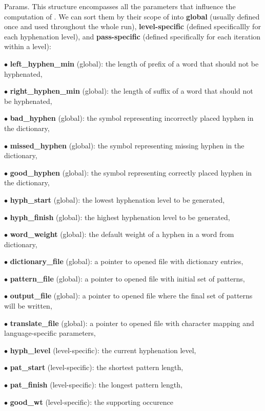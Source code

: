 Params.
This structure encompasses all the parameters that influence the computation of
\utfpatgen. We can sort them by their
scope of into {\bf global} (usually defined once and used throughout the whole
run), {\bf level-specific} (defined
specificallly for each hyphenation level), and {\bf pass-specific} (defined
specifically for each iteration within
a level):

\item{$\bullet$} {\bf left\_hyphen\_min} (global): the length of prefix of a
word that should not be hyphenated,
\item{$\bullet$} {\bf right\_hyphen\_min} (global): the length of suffix of a
word that should not be hyphenated,
\item{$\bullet$} {\bf bad\_hyphen} (global): the symbol representing
incorrectly placed hyphen in the dictionary,
\item{$\bullet$} {\bf missed\_hyphen} (global): the symbol representing missing
hyphen in the dictionary,
\item{$\bullet$} {\bf good\_hyphen} (global): the symbol representing correctly
placed hyphen in the dictionary,
\item{$\bullet$} {\bf hyph\_start} (global): the lowest hyphenation level to be
generated,
\item{$\bullet$} {\bf hyph\_finish} (global): the highest hyphenation level to
be generated,
\item{$\bullet$} {\bf word\_weight} (global): the default weight of a hyphen in
a word from dictionary,
\item{$\bullet$} {\bf dictionary\_file} (global): a pointer to opened file with
dictionary entries,
\item{$\bullet$} {\bf pattern\_file} (global): a pointer to opened file with
initial set of patterns,
\item{$\bullet$} {\bf output\_file} (global): a pointer to opened file where
the final set of patterns will be
written,
\item{$\bullet$} {\bf translate\_file} (global): a pointer to opened file with
character mapping and
language-specific parameters,
\item{$\bullet$} {\bf hyph\_level} (level-specific): the current hyphenation
level,
\item{$\bullet$} {\bf pat\_start} (level-specific): the shortest pattern
length,
\item{$\bullet$} {\bf pat\_finish} (level-specific): the longest pattern
length,
\item{$\bullet$} {\bf good\_wt} (level-specific): the supporting occurence
